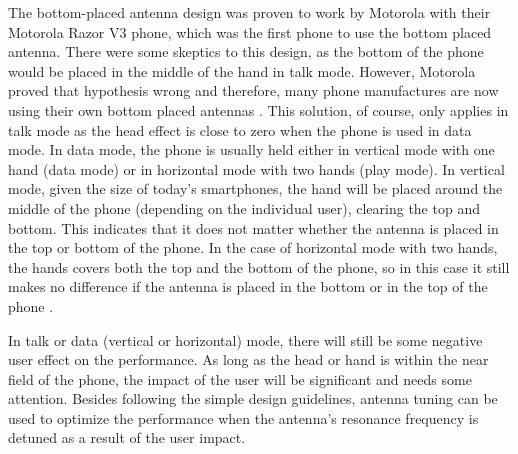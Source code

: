 The bottom-placed antenna design was proven to work by Motorola with their Motorola Razor V3 phone, which was the first phone to use the bottom placed antenna. There were some skeptics to this design, as the bottom of the phone would be placed in the middle of the hand in talk mode. However, Motorola proved that hypothesis wrong and therefore, many phone manufactures are now using their own bottom placed antennas \cite{Zhijun2011antdesign}. This solution, of course, only applies in talk mode as the head effect is close to zero when the phone is used in data mode. In data mode, the phone is usually held either in vertical mode with one hand (data mode) or in horizontal mode with two hands (play mode). In vertical mode, given the size of today's smartphones, the hand will be placed around the middle of the phone (depending on the individual user), clearing the top and bottom. This indicates that it does not matter whether the antenna is placed in the top or bottom of the phone. In the case of horizontal mode with two hands, the hands covers both the top and the bottom of the phone, so in this case it still makes no difference if the antenna is placed in the bottom or in the top of the phone \cite{Zhijun2011antdesign}.

In talk or data (vertical or horizontal) mode, there will still be some negative user effect on the performance. As long as the head or hand is within the near field of the phone, the impact of the user will be significant and needs some attention. Besides following the simple design guidelines, antenna tuning can be used to optimize the performance when the antenna's resonance frequency is detuned as a result of the user impact.

